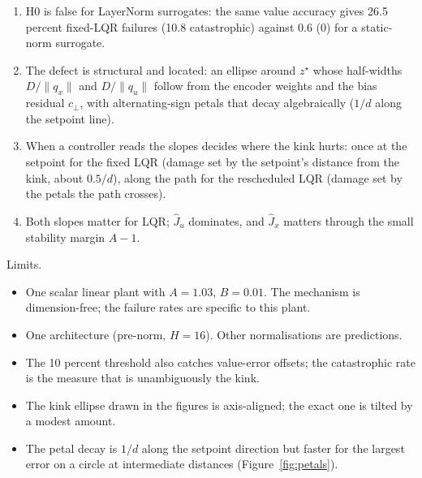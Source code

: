 \documentclass[11pt]{article}
\begin{document}
\begin{enumerate}
\item H0 is false for LayerNorm surrogates: the same value accuracy gives 26.5 percent fixed-LQR failures (10.8 catastrophic) against 0.6 (0) for a static-norm surrogate.
\item The defect is structural and located: an ellipse around $z^\star$ whose half-widths $D/\|q_x\|$ and $D/\|q_u\|$ follow from the encoder weights and the bias residual $c_\perp$, with alternating-sign petals that decay algebraically ($1/d$ along the setpoint line).
\item When a controller reads the slopes decides where the kink hurts: once at the setpoint for the fixed LQR (damage set by the setpoint's distance from the kink, about $0.5/d$), along the path for the rescheduled LQR (damage set by the petals the path crosses).
\item Both slopes matter for LQR; $\hat J_u$ dominates, and $\hat J_x$ matters through the small stability margin $A-1$.
\end{enumerate}

Limits.
\begin{itemize}
\item One scalar linear plant with $A=1.03$, $B=0.01$. The mechanism is dimension-free; the failure rates are specific to this plant.
\item One architecture (pre-norm, $H=16$). Other normalisations are predictions.
\item The 10 percent threshold also catches value-error offsets; the catastrophic rate is the measure that is unambiguously the kink.
\item The kink ellipse drawn in the figures is axis-aligned; the exact one is tilted by a modest amount.
\item The petal decay is $1/d$ along the setpoint direction but faster for the largest error on a circle at intermediate distances (Figure~\ref{fig:petals}).
\end{itemize}
\end{document}
